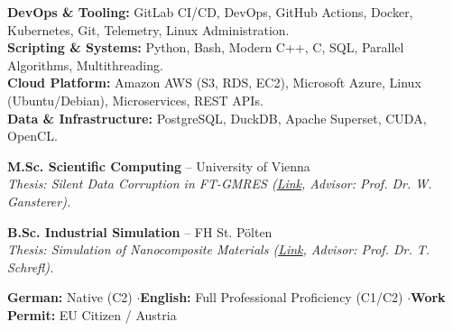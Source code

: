 \documentclass[10pt,a4paper]{article}
\begin{document}

\textbf{DevOps \& Tooling:} GitLab CI/CD, DevOps, GitHub Actions, Docker, Kubernetes, Git, Telemetry, Linux Administration.\\[0.05em]
\textbf{Scripting \& Systems:} Python, Bash, Modern C++, C, SQL, Parallel Algorithms, Multithreading.\\[0.05em]
\textbf{Cloud Platform:} Amazon AWS (S3, RDS, EC2), Microsoft Azure, Linux (Ubuntu/Debian), Microservices, REST APIs.\\[0.05em]
\textbf{Data \& Infrastructure:} PostgreSQL, DuckDB, Apache Superset, CUDA, OpenCL.


\textbf{M.Sc. Scientific Computing} -- University of Vienna \\
\textit{Thesis: Silent Data Corruption in FT-GMRES (\href{https://utheses.univie.ac.at/detail/40917/}{Link}, Advisor: Prof. Dr. W. Gansterer).}

\vspace{0.1cm}
\textbf{B.Sc. Industrial Simulation} -- FH St. Pölten \\
\textit{Thesis: Simulation of Nanocomposite Materials (\href{\meinGithub/thesis/blob/master/Bakkarbeit_final.pdf}{Link}, Advisor: Prof. Dr. T. Schrefl).}

\engineeringApproach


\textbf{German:} Native (C2) \quad$\cdot$\quad \textbf{English:} Full Professional Proficiency (C1/C2) \quad$\cdot$\quad \textbf{Work Permit:} EU Citizen / Austria
\end{document}
